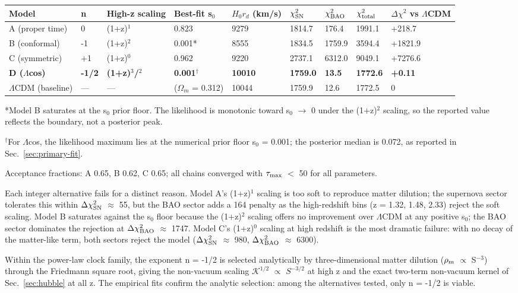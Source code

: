 {\def\LTcaptype{none} %
\begin{table}[!htb]
\centering\footnotesize
\begin{tabular}{@{}lllllllll@{}}
\toprule
Model & n & High-z scaling & Best-fit s$_0$ & $H_0 r_d$ (km/s) & $\chi^2_{\rm SN}$ & $\chi^2_{\rm BAO}$ & $\chi^2_{\rm total}$ & $\Delta\chi^2$ vs $\Lambda$CDM \\
\midrule

A (proper time) & 0 & (1+z)$^1$ & 0.823 & 9279 & 1814.7 & 176.4 & 1991.1 &
+218.7 \\
B (conformal) & -1 & (1+z)$^2$ & 0.001* & 8555 & 1834.5 & 1759.9 & 3594.4 &
+1821.9 \\
C (symmetric) & +1 & (1+z)$^0$ & 0.962 & 9220 & 2737.1 & 6312.0 & 9049.1 &
+7276.6 \\
\textbf{D ($\Lambda$cos)} & \textbf{-1/2} & \textbf{(1+z)$^3$/$^2$} & \textbf{0.001$^\dagger$}
& \textbf{10010} & \textbf{1759.0} & \textbf{13.5} & \textbf{1772.6} &
\textbf{+0.11} \\
$\Lambda$CDM (baseline) & --- & --- & ($\Omega_m$ = 0.312) & 10044 & 1759.9 & 12.6 &
1772.5 & 0 \\
\bottomrule
\end{tabular}
\end{table}
}

*Model B saturates at the s$_0$ prior floor. The likelihood is monotonic
toward s$_0$ $\to$ 0 under the (1+z)$^2$ scaling, so the reported value reflects
the boundary, not a posterior peak.

$^\dagger$For $\Lambda$cos, the likelihood maximum lies at the numerical prior floor s$_0$ =
0.001; the posterior median is 0.072, as reported in Sec.~\ref{sec:primary-fit}.

Acceptance fractions: A 0.65, B 0.62, C 0.65; all chains converged with
$\tau_{\rm max}$ $<$ 50 for all parameters.

Each integer alternative fails for a distinct reason. Model A's (1+z)$^1$
scaling is too soft to reproduce matter dilution; the supernova sector
tolerates this within $\Delta\chi^2_{\rm SN}$ $\approx$ 55, but the BAO sector adds a 164
penalty as the high-redshift bins (z = 1.32, 1.48, 2.33) reject the soft
scaling. Model B saturates against the s$_0$ floor because the (1+z)$^2$
scaling offers no improvement over $\Lambda$CDM at any positive s$_0$; the BAO
sector dominates the rejection at $\Delta\chi^2_{\rm BAO}$ $\approx$ 1747. Model C's (1+z)$^0$
scaling at high redshift is the most dramatic failure: with no decay of
the matter-like term, both sectors reject the model ($\Delta\chi^2_{\rm SN}$ $\approx$ 980,
$\Delta\chi^2_{\rm BAO}$ $\approx$ 6300).

Within the power-law clock family, the exponent n = -1/2 is selected
analytically by three-dimensional matter dilution ($\rho_{\rm m}$ $\propto$ S$^{-3}$) through
the Friedmann square root, giving the non-vacuum scaling $\mathcal{K}^{1/2}$ $\propto$ $S^{-3/2}$ at
high z and the exact two-term non-vacuum kernel of Sec.~\ref{sec:hubble} at all z. The
empirical fits confirm the analytic selection: among the alternatives
tested, only n = -1/2 is viable.

